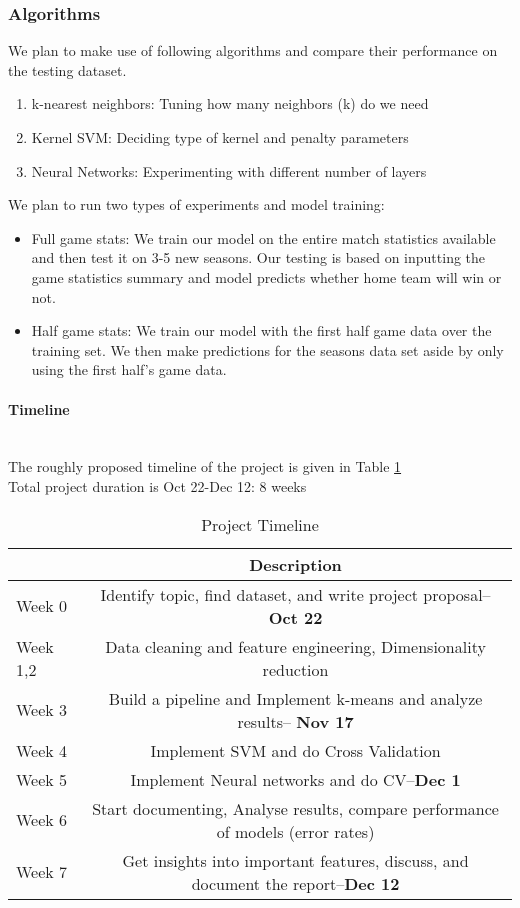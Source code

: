 \documentclass[11pt,letterpaper]{article}
\begin{document}
\subsubsection*{Algorithms}
We plan to make use of following algorithms and compare their performance on the testing dataset.
\begin{enumerate}
    \item k-nearest neighbors: Tuning how many neighbors (k) do we need
    \item Kernel SVM: Deciding type of kernel and penalty parameters
    \item Neural Networks: Experimenting with different number of layers
\end{enumerate}
We plan to run two types of experiments and model training:
\begin{itemize}
    \item Full game stats: We train our model on the entire match statistics available and then test it on 3-5 new seasons. Our testing is based on inputting the game statistics summary and model predicts whether home team will win or not.
    \item Half game stats: We train our model with the first half game data over the training set. We then make predictions for the seasons data set aside by only using the first half's game data. 
\end{itemize}

\paragraph{Timeline}\text{}\\
The roughly proposed timeline of the project is given in Table \ref{tab:timeline}\\
Total project duration is Oct 22-Dec 12: 8 weeks
\begin{table}[h!]
    \centering
    \begin{tabular}{l|c}
         \hline
        & Description \\
         \hline
        Week 0 & Identify topic, find dataset, and write project proposal--\textbf{Oct 22}\\
        Week 1,2 & Data cleaning and feature engineering, Dimensionality reduction\\
        Week 3 & Build a pipeline and Implement k-means and analyze results-- \textbf{Nov 17}\\
        Week 4 & Implement SVM and do Cross Validation \\
        Week 5 & Implement Neural networks and do CV--\textbf{Dec 1}\\
        Week 6 & Start documenting, Analyse results, compare performance of models (error rates) \\
        Week 7 & Get insights into important features, discuss, and document the report--\textbf{Dec 12}\\
        \hline
    \end{tabular}
    \caption{Project Timeline}
    \label{tab:timeline}
\end{table}
\end{document}
